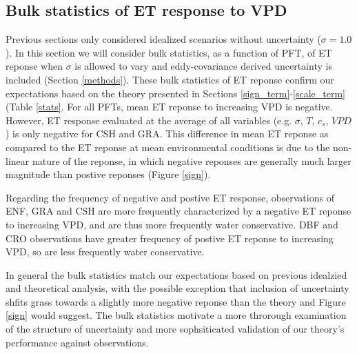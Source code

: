 \documentclass[draft,linenumbers]{agujournal}
\begin{document}
\subsection{Bulk statistics of ET response to VPD}
\label{stats_sec}
Previous sections only considered idealized scenarios without uncertainty ($\sigma = 1.0$). In this section we will consider bulk statistics, as a function of PFT, of ET reponse when $\sigma$ is allowed to vary and eddy-covariance derived uncertainty is included (Section \ref{methods}).  These bulk statistics of ET reponse confirm our expectations based on the theory presented in Sections \ref{sign_term}-\ref{scale_term} (Table \ref{stats}. For all PFTs, mean ET reponse to increasing VPD is negative. However, ET response evaluated at the average of all variables (e.g. $\sigma$, $T$, $c_s$, $VPD$) is only negative for CSH and GRA. This difference in mean ET reponse as compared to the ET reponse at mean environmental conditions is due to the non-linear nature of the reponse, in which negative reponses are generally much larger magnitude than postive reponses (Figure \ref{sign}).

Regarding the frequency of negative and postive ET response, observations of ENF, GRA and CSH are more frequently characterized by a negative ET reponse to increasing VPD, and are thus more frequently water conservative. DBF and CRO observations have greater frequency of postive ET reponse to increasing VPD, so are less frequently water conservative. 

In general the bulk statistics match our expectations based on previous idealzied and theoretical analysis, with the possible exception that inclusion of uncertainty shfits grass towards a slightly more negative reponse than the theory and Figure \ref{sign} would suggest. The bulk statistics motivate a more throrough examination of the structure of uncertainty and more sophsiticated validation of our theory's performance against observations. 
\end{document}
